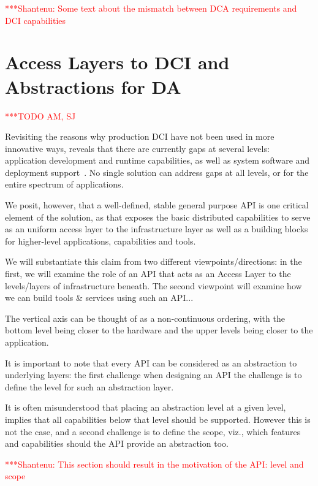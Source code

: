 \documentclass[a4paper,12pt]{article}
\newcommand{\todo}[1]{     {\textcolor{red}  { ***TODO      #1 }}}
\newcommand{\jhanote}[1]{  {\textcolor{red}  { ***Shantenu: #1 }}}
\newcommand{\todo}[1]{}
\newcommand{\jhanote}[1]{}
\begin{document}
 \jhanote{Some text about the mismatch between DCA requirements and
  DCI capabilities}


% 
\section{Access Layers to DCI and Abstractions for DA}\todo{AM, SJ}

Revisiting the reasons why production DCI have not been used in more
innovative ways, reveals that there are currently gaps at several
levels: application development and runtime capabilities, as well as
system software and deployment support~\cite{dpagrid2009}.  No single
solution can address gaps at all levels, or for the entire spectrum of
applications.  

We posit, however, that a well-defined, stable general purpose API is
one critical element of the solution, as that exposes the basic
distributed capabilities to serve as an uniform access layer to the
infrastructure layer as well as a building blocks for higher-level
applications, capabilities and tools.

We will substantiate this claim from two different
viewpoints/directions: in the first, we will examine the role of an
API that acts as an Access Layer to the levels/layers of
infrastructure beneath. The second viewpoint will examine how we can
build tools \& services using such an API...

The vertical axis can be thought of as a non-continuous ordering, with
the bottom level being closer to the hardware and the upper levels
being closer to the application.

It is important to note that every API can be considered as an
abstraction to underlying layers: the first challenge when designing
an API the challenge is to define the level for such an abstraction
layer.  

It is often misunderstood that placing an abstraction level at a given
level, implies that all capabilities below that level should be
supported. However this is not the case, and a second challenge is to
define the scope, viz., which features and capabilities should the API
provide an abstraction too.

\jhanote{This section should result in the motivation of the API:
  level and scope}

\end{document}
